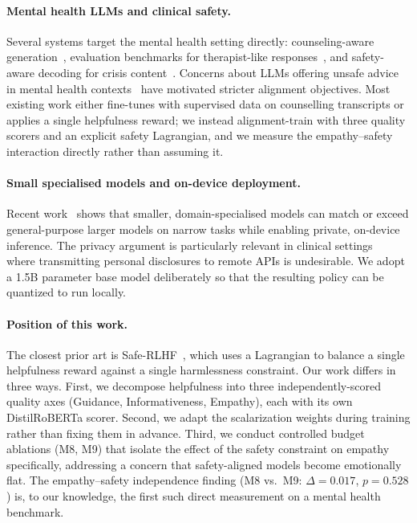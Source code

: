 \documentclass[10pt,twocolumn]{article}
\begin{document}
\paragraph{Mental health LLMs and clinical safety.}
Several systems target the mental health setting directly: counseling-aware generation~\citep{liu2023chatcounselor, hua2024mentalllm}, evaluation benchmarks for therapist-like responses~\citep{counselbench2024, counselchat2020}, and safety-aware decoding for crisis content~\citep{xu2024mhsafety}. Concerns about LLMs offering unsafe advice in mental health contexts~\citep{demszky2023llmclinical, lawrence2024harms} have motivated stricter alignment objectives. Most existing work either fine-tunes with supervised data on counselling transcripts or applies a single helpfulness reward; we instead alignment-train with three quality scorers and an explicit safety Lagrangian, and we measure the empathy--safety interaction directly rather than assuming it.

\paragraph{Small specialised models and on-device deployment.}
Recent work~\citep{abdin2024phi3, dubey2024llama3, qwen2024technical} shows that smaller, domain-specialised models can match or exceed general-purpose larger models on narrow tasks while enabling private, on-device inference. The privacy argument is particularly relevant in clinical settings~\citep{singhal2023med, lawrence2024harms} where transmitting personal disclosures to remote APIs is undesirable. We adopt a 1.5B parameter base model deliberately so that the resulting policy can be quantized to run locally.

\paragraph{Position of this work.}
The closest prior art is Safe-RLHF~\citep{dai2024saferlhf}, which uses a Lagrangian to balance a single helpfulness reward against a single harmlessness constraint. Our work differs in three ways. First, we decompose helpfulness into three independently-scored quality axes (Guidance, Informativeness, Empathy), each with its own DistilRoBERTa scorer. Second, we adapt the scalarization weights during training rather than fixing them in advance. Third, we conduct controlled budget ablations (M8, M9) that isolate the effect of the safety constraint on empathy specifically, addressing a concern that safety-aligned models become emotionally flat. The empathy--safety independence finding (M8 vs.\ M9: $\Delta = 0.017$, $p = 0.528$) is, to our knowledge, the first such direct measurement on a mental health benchmark.
\end{document}
